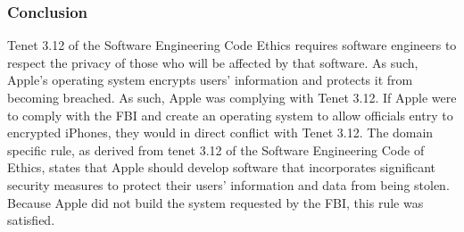 \subsubsection{Conclusion}
Tenet 3.12 of the Software Engineering Code Ethics requires software engineers to respect the privacy of those who will be affected by that software. As such, Apple's operating system encrypts users' information and protects it from becoming breached. As such, Apple was complying with Tenet 3.12. If Apple were to comply with the FBI and create an operating system to allow officials entry to encrypted iPhones, they would in direct conflict with Tenet 3.12. The domain specific rule, as derived from tenet 3.12 of the Software Engineering Code of Ethics, states that Apple should develop software that incorporates significant security measures to protect their users' information and data from being stolen. Because Apple did not build the system requested by the FBI, this rule was satisfied.


\vspace{0.2cm}
